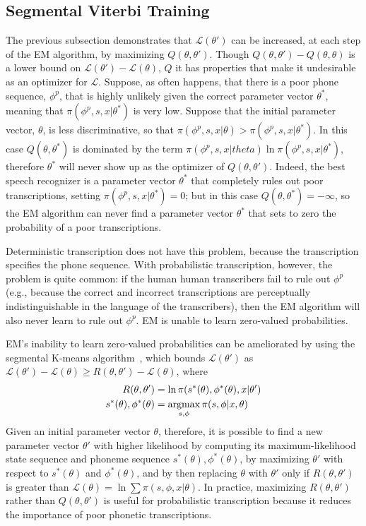 \subsection{Segmental Viterbi Training}

The previous subsection demonstrates that ${\mathcal L}(\theta')$ can
be increased, at each step of the EM algorithm, by maximizing
$Q(\theta,\theta')$.  Though $Q(\theta,\theta')-Q(\theta,\theta)$ is a
lower bound on ${\mathcal L}(\theta')-{\mathcal L}(\theta)$, $Q$ it
has properties that make it undesirable as an optimizer for ${\mathcal
  L}$.  Suppose, as often happens, that there is a poor phone
sequence, $\phi^p$, that is highly unlikely given the correct
parameter vector $\theta^*$, meaning that $\pi(\phi^p,s,x|\theta^*)$
is very low.  Suppose that the initial parameter vector, $\theta$, is
less discriminative, so that
$\pi(\phi^p,s,x|\theta)>\pi(\phi^p,s,x|\theta^*)$.  In this case
$Q(\theta,\theta^*)$ is dominated by the term
$\pi(\phi^p,s,x|theta)\ln\pi(\phi^p,s,x|\theta^*)$, therefore
$\theta^*$ will never show up as the optimizer of $Q(\theta,\theta')$.
Indeed, the best speech recognizer is a parameter vector $\theta^*$
that completely rules out poor transcriptions, setting
$\pi(\phi^p,s,x|\theta^*)=0$; but in this case
$Q(\theta,\theta^*)=-\infty$, so the EM algorithm can never find a
parameter vector $\theta^*$ that sets to zero the probability of a
poor transcriptions.

Deterministic transcription does not have this problem, because the
transcription specifies the phone sequence.  With probabilistic
transcription, however, the problem is quite common: if the human
human transcribers fail to rule out $\phi^p$ (e.g., because the
correct and incorrect transcriptions are perceptually
indistinguishable in the language of the transcribers), then the EM
algorithm will also never learn to rule out $\phi^p$.  EM is unable
to learn zero-valued probabilities.

EM's inability to learn zero-valued probabilities can be ameliorated
by using the segmental K-means algorithm~\cite{Juang1990}, which
bounds ${\mathcal L}(\theta')$ as
$\mathcal{L}(\theta')-\mathcal{L}(\theta)\ge
R(\theta,\theta')-\mathcal{L}(\theta)$, where
\begin{align}
  R(\theta,\theta') &= \ln \pi(s^*(\theta),\phi^*(\theta),x|\theta')\\
  s^*(\theta),\phi^*(\theta)&= \operatorname*{argmax}_{s,\phi} \pi(s,\phi|x,\theta)
\end{align}
Given an initial parameter vector $\theta$, therefore, it is possible
to find a new parameter vector $\theta'$ with higher likelihood by
computing its maximum-likelihood state sequence and phoneme sequence
$s^*(\theta),\phi^*(\theta)$, by maximizing $\theta'$ with respect to
$s^*(\theta)$ and $\phi^*(\theta)$, and by then replacing $\theta$
with $\theta'$ only if $R(\theta,\theta')$ is greater than ${\mathcal
  L}(\theta)=\ln \sum\pi(s,\phi,x|\theta)$.  In practice, maximizing
$R(\theta,\theta')$ rather than $Q(\theta,\theta')$ is useful for
probabilistic transcription because it reduces the importance of poor
phonetic transcriptions.
